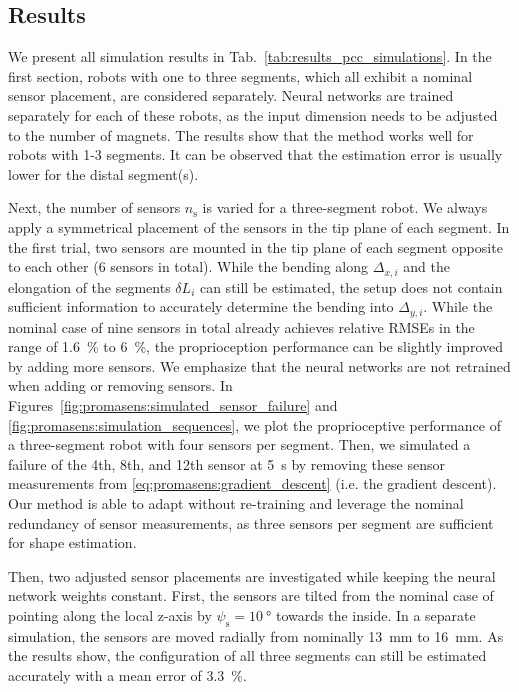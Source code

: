 \subsection{Results}\label{sub:promasens:simulation_pcc_results}
We present all simulation results in Tab.~\ref{tab:results_pcc_simulations}.
In the first section, robots with one to three segments, which all exhibit a nominal sensor placement, are considered separately. Neural networks are trained separately for each of these robots, as the input dimension needs to be adjusted to the number of magnets.
The results show that the method works well for robots with 1-3 segments. It can be observed that the estimation error is usually lower for the distal segment(s).

Next, the number of sensors $n_\mathrm{s}$ is varied for a three-segment robot. We always apply a symmetrical placement of the sensors in the tip plane of each segment. In the first trial, two sensors are mounted in the tip plane of each segment opposite to each other (6 sensors in total). While the bending along $\Delta_{x,i}$ and the elongation of the segments $\delta L_i$ can still be estimated, the setup does not contain sufficient information to accurately determine the bending into $\Delta_{y,i}$.
While the nominal case of nine sensors in total already achieves relative RMSEs in the range of \SI{1.6}{\percent} to \SI{6}{\percent}, the proprioception performance can be slightly improved by adding more sensors.
We emphasize that the neural networks are not retrained when adding or removing sensors.
In Figures~\ref{fig:promasens:simulated_sensor_failure} and \ref{fig:promasens:simulation_sequences}, we plot the proprioceptive performance of a three-segment robot with four sensors per segment. Then, we simulated a failure of the 4th, 8th, and 12th sensor at \SI{5}{s} by removing these sensor measurements from \eqref{eq:promasens:gradient_descent} (i.e. the gradient descent). Our method is able to adapt without re-training and leverage the nominal redundancy of sensor measurements, as three sensors per segment are sufficient for shape estimation.

Then, two adjusted sensor placements are investigated while keeping the neural network weights constant. First, the sensors are tilted from the nominal case of pointing along the local z-axis by $\psi_\mathrm{s} = \SI{10}{\degree}$ towards the inside. In a separate simulation, the sensors are moved radially from nominally \SI{13}{mm} to \SI{16}{mm}. As the results show, the configuration of all three segments can still be estimated accurately with a mean error of \SI{3.3}{\percent}.

